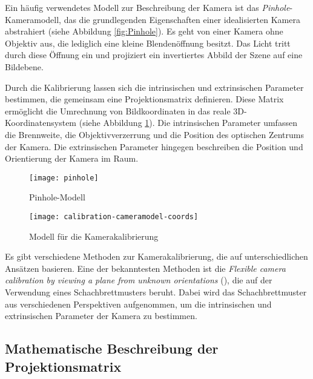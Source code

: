 Ein häufig verwendetes Modell zur Beschreibung der Kamera ist das \textit{Pinhole}-Kameramodell, das die grundlegenden Eigenschaften einer idealisierten Kamera abstrahiert (siehe Abbildung \ref{fig:Pinhole}). Es geht von einer Kamera ohne Objektiv aus, die lediglich eine kleine Blendenöffnung besitzt. Das Licht tritt durch diese Öffnung ein und projiziert ein invertiertes Abbild der Szene auf eine Bildebene. \cite{mw2024calibration}

Durch die Kalibrierung lassen sich die intrinsischen und extrinsischen Parameter bestimmen, die gemeinsam eine Projektionsmatrix definieren. Diese Matrix ermöglicht die Umrechnung von Bildkoordinaten in das reale 3D-Koordinatensystem (siehe Abbildung \ref{fig:Kalibrierung}). Die intrinsischen Parameter umfassen die Brennweite, die Objektivverzerrung und die Position des optischen Zentrums der Kamera. Die extrinsischen Parameter hingegen beschreiben die Position und Orientierung der Kamera im Raum. \cite{mw2024calibration}

\begin{figure}[h]
    \centering
    \begin{minipage}{0.45\textwidth}
        \centering
        \texttt{[image: pinhole]}
        \caption{Pinhole-Modell \cite{mw2024calibration}\label{fig:Pinhole}}
    \end{minipage}
    \hfill
    \begin{minipage}{0.45\textwidth}
        \centering
        \texttt{[image: calibration-cameramodel-coords]}
        \caption{Modell für die Kamerakalibrierung \cite{mw2024calibration}\label{fig:Kalibrierung}}
    \end{minipage}
\end{figure}

Es gibt verschiedene Methoden zur Kamerakalibrierung, die auf unterschiedlichen Ansätzen basieren. Eine der bekanntesten Methoden ist die \textit{Flexible camera calibration by viewing a plane from unknown orientations} (\citet{zhang1999calibration}), die auf der Verwendung eines Schachbrettmusters beruht. Dabei wird das Schachbrettmuster aus verschiedenen Perspektiven aufgenommen, um die intrinsischen und extrinsischen Parameter der Kamera zu bestimmen. \cite{stachniss2021calibration, zhang1999calibration}

\subsection{Mathematische Beschreibung der Projektionsmatrix}

